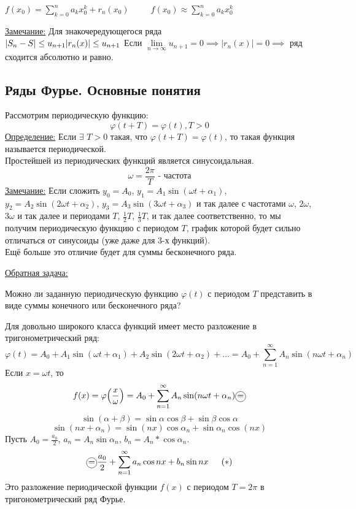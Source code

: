 \documentclass[12pt]{article}
\newcommand*\circled[1]{\tikz[baseline=(char.base)]{
    \node[shape=circle, draw, inner sep=1pt, 
        minimum height=12pt] (char) {#1};}}
\let\oldsum\sum
\let\oldlim\lim
\renewcommand{\sum}{\oldsum\limits}
\renewcommand{\lim}{\oldlim\limits}
\begin{document}
    $
     f(x_0)=\sum_{k=0}^{n} a_k x_0^k+r_n(x_0) \hspace{30pt}
     f(x_0) \approx \sum_{k=0}^{n} a_k x_0^k 
    $

    \underline{Замечание:} Для знакочередующегося ряда\\
    $
    |S_n-S|\leq u_{n+1}\\
    |r_n(x)|\leq u_{n+1}
    $
    Если $\lim_{n \to \infty} u_{n+1} = 0 \implies |r_n(x)| = 0 \implies$ ряд сходится абсолютно и равно.
    \subsection{Ряды Фурье. Основные понятия}\noindent
    Рассмотрим периодическую функцию:
    \[ \varphi (t+T) = \varphi(t), T > 0 \]
    \underline{Определение:} Если $\exists$ $T>0$ такая, что $\varphi(t+T)=\varphi(t)$, то такая функция называется периодической.\\
    Простейшей из периодических функций является синусоидальная.
    \[ \omega = \frac{2 \pi}{T} \text{ - частота} \]
    \underline{Замечание:} Если сложить $y_0 = A_0$, $y_1 = A_1\sin(\omega t + \alpha_1)$, $y_2 = A_2\sin(2\omega t + \alpha_2)$, $y_3 = A_3\sin(3\omega t + \alpha_3)$ и так далее с частотами $\omega$, $2\omega$, $3\omega$ и так далее и периодами $T$, $\frac{1}{2}T$, $\frac{1}{3}T$, и так далее соответственно, то мы получим периодическую функцию с периодом $T$, график которой будет сильно отличаться от синусоиды (уже даже для 3-х функций).\\
    Ещё больше это отличие будет для суммы бесконечного ряда.\par\noindent
    \underline{Обратная задача:}
    \begin{adjustwidth}{1.5em}{1.5em}
      Можно ли заданную периодическую функцию $\varphi(t)$ с периодом $T$ представить в виде суммы конечного или бесконечного ряда?
    \end{adjustwidth}
    Для довольно широкого класса функций имеет место разложение в тригонометрический ряд:
    \[ \varphi(t) = A_0 + A_1 \sin(\omega t + \alpha_1) + A_2 \sin(2\omega t + \alpha_2) + \dots = A_0 + \sum_{n=1}^{\infty} A_n \sin(n\omega t + \alpha_n) \]
    Если $x = \omega t$, то
    \[ f(x) = \varphi\Big(\frac{x}{\omega}\Big) = A_0 + \sum_{n=1}^{\infty} A_n \sin(n\omega t + \alpha_n) \circled{=} \]
    \[ \sin(\alpha + \beta) = \sin \alpha \cos \beta + \sin \beta \cos \alpha \]
    \[ \sin(nx + \alpha_n) = \sin(nx) \cos \alpha_n + \sin \alpha_n \cos (nx) \]
    Пусть $A_0 = \frac{a_0}{2}$, $a_n = A_n \sin \alpha_n$, $b_n = A_n * \cos \alpha_n$.
    \[ \circled{=} \frac{a_0}{2} + \sum_{n=1}^{\infty} a_n \cos nx + b_n \sin nx \indent (*) \]
    Это разложение периодической функции $f(x)$ с периодом $T = 2\pi$ в тригонометрический ряд Фурье.
    
\end{document}
